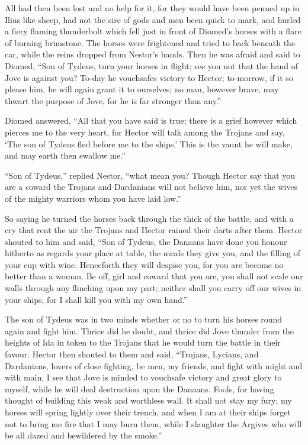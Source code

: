 All had then been lost and no help for it, for they would have been penned
up in Ilius like sheep, had not the sire of gods and men been quick to
mark, and hurled a fiery flaming thunderbolt which fell just in front of
Diomed’s horses with a flare of burning brimstone. The horses were
frightened and tried to back beneath the car, while the reins dropped from
Nestor’s hands. Then he was afraid and said to Diomed, “Son of Tydeus,
turn your horses in flight; see you not that the hand of Jove is against
you? To-day he vouchsafes victory to Hector; to-morrow, if it so please
him, he will again grant it to ourselves; no man, however brave, may
thwart the purpose of Jove, for he is far stronger than any.”

Diomed answered, “All that you have said is true; there is a grief however
which pierces me to the very heart, for Hector will talk among the Trojans
and say, ‘The son of Tydeus fled before me to the ships.’ This is the
vaunt he will make, and may earth then swallow me.”

“Son of Tydeus,” replied Nestor, “what mean you? Though Hector say that
you are a coward the Trojans and Dardanians will not believe him, nor yet
the wives of the mighty warriors whom you have laid low.”

So saying he turned the horses back through the thick of the battle, and
with a cry that rent the air the Trojans and Hector rained their darts
after them. Hector shouted to him and said, “Son of Tydeus, the Danaans
have done you honour hitherto as regards your place at table, the meals
they give you, and the filling of your cup with wine. Henceforth they will
despise you, for you are become no better than a woman. Be off, girl and
coward that you are, you shall not scale our walls through any flinching
upon my part; neither shall you carry off our wives in your ships, for I
shall kill you with my own hand.”

The son of Tydeus was in two minds whether or no to turn his horses round
again and fight him. Thrice did he doubt, and thrice did Jove thunder from
the heights of Ida in token to the Trojans that he would turn the battle
in their favour. Hector then shouted to them and said, “Trojans, Lycians,
and Dardanians, lovers of close fighting, be men, my friends, and fight
with might and with main; I see that Jove is minded to vouchsafe victory
and great glory to myself, while he will deal destruction upon the
Danaans. Fools, for having thought of building this weak and worthless
wall. It shall not stay my fury; my horses will spring lightly over their
trench, and when I am at their ships forget not to bring me fire that I
may burn them, while I slaughter the Argives who will be all dazed and
bewildered by the smoke.”

